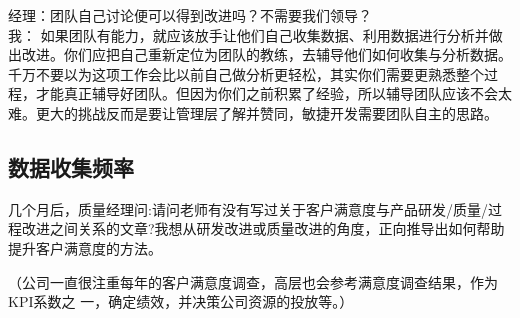 经理：团队自己讨论便可以得到改进吗？不需要我们领导？\\
我：
如果团队有能力，就应该放手让他们自己收集数据、利用数据进行分析并做出改进。你们应把自己重新定位为团队的教练，去辅导他们如何收集与分析数据。千万不要以为这项工作会比以前自己做分析更轻松，其实你们需要更熟悉整个过程，才能真正辅导好团队。但因为你们之前积累了经验，所以辅导团队应该不会太难。更大的挑战反而是要让管理层了解并赞同，敏捷开发需要团队自主的思路。

\hypertarget{ux6570ux636eux6536ux96c6ux9891ux7387}{%
\subsection{数据收集频率}\label{ux6570ux636eux6536ux96c6ux9891ux7387}}

几个月后，质量经理问:请问老师有没有写过关于客户满意度与产品研发/质量/过程改进之间关系的文章?我想从研发改进或质量改进的角度，正向推导出如何帮助提升客户满意度的方法。

\begin{description}
\tightlist
\item[]
（公司一直很注重每年的客户满意度调查，高层也会参考满意度调查结果，作为
KPI系数之 一，确定绩效，并决策公司资源的投放等。）\\
\end{description}

